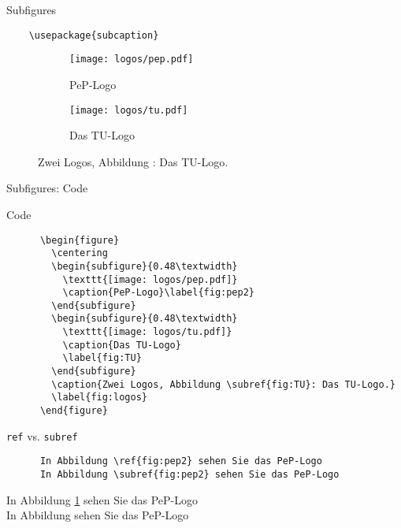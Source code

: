 \begin{frame}[fragile]{Subfigures}
  \begin{Packages}
    \begin{lstlisting}
    \usepackage{subcaption}
    \end{lstlisting}
  \end{Packages}
      \begin{figure}
        \centering
        \begin{subfigure}{0.48\textwidth}
          \texttt{[image: logos/pep.pdf]}
          \caption{PeP-Logo}\label{fig:pep2}
        \end{subfigure}
        \begin{subfigure}{0.48\textwidth}
          \texttt{[image: logos/tu.pdf]}
          \caption{Das TU-Logo}\label{fig:TU}
        \end{subfigure}
        \caption{Zwei Logos, Abbildung : Das TU-Logo.}\label{fig:logos}
      \end{figure}
\end{frame}

\begin{frame}[fragile]{Subfigures: Code}
  \begin{block}{Code}
    \begin{lstlisting}
      \begin{figure}
        \centering
        \begin{subfigure}{0.48\textwidth}
          \texttt{[image: logos/pep.pdf]}
          \caption{PeP-Logo}\label{fig:pep2}
        \end{subfigure}
        \begin{subfigure}{0.48\textwidth}
          \texttt{[image: logos/tu.pdf]}
          \caption{Das TU-Logo}
          \label{fig:TU}
        \end{subfigure}
        \caption{Zwei Logos, Abbildung \subref{fig:TU}: Das TU-Logo.}
        \label{fig:logos}
      \end{figure}
    \end{lstlisting}
  \end{block}
\end{frame}

\begin{frame}[fragile]{\texttt{ref} vs. \texttt{subref}}
  \begin{CodeExample}{0.48}
    \begin{lstlisting}
      In Abbildung \ref{fig:pep2} sehen Sie das PeP-Logo
      In Abbildung \subref{fig:pep2} sehen Sie das PeP-Logo
    \end{lstlisting}
    \CodeResult
      In Abbildung \ref{fig:pep2} sehen Sie das PeP-Logo\\
      In Abbildung  sehen Sie das PeP-Logo
  \end{CodeExample}
\end{frame}
